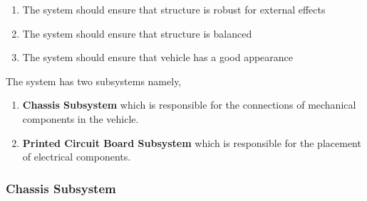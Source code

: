 \documentclass[a4paper,12pt]{article}
\begin{document}
		\begin{enumerate}
			\item The system should	ensure that structure is robust for external effects 
			\item The system should	ensure that structure is balanced
			\item The system should ensure that vehicle has a good appearance
		\end{enumerate}	
		
		
		The system has two subsystems namely,
		
		\begin{enumerate}
			\item \textbf{Chassis Subsystem} which is responsible for the connections of mechanical components in the vehicle.
			\item \textbf{Printed Circuit Board Subsystem} which is responsible for the placement of electrical components.
		\end{enumerate}
		

	\subsubsection{Chassis Subsystem}
	
\end{document}
